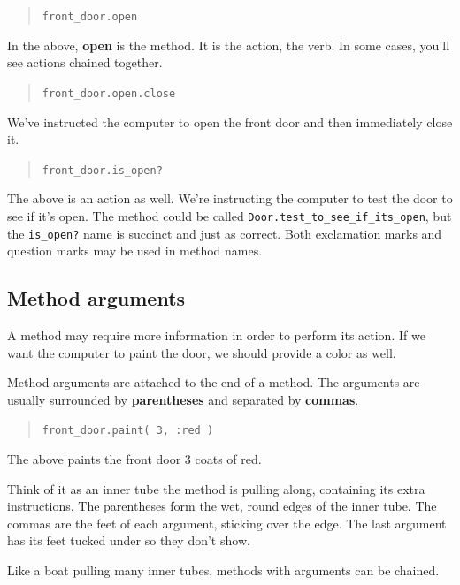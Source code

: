 \documentclass[10pt,twoside]{report}
\begin{document}
\begin{quote}
\lstinline[breaklines=true]|front_door.open|\end{quote}


In the above, {\bf open} is the method.  It is the action, the
verb. In some cases, you'll see actions chained together.

\begin{quote}
\lstinline[breaklines=true]|front_door.open.close|\end{quote}


We've instructed the computer to open the front door and then
immediately close it.

\begin{quote}
\lstinline[breaklines=true]|front_door.is_open?|\end{quote}


The above is an action as well.  We're instructing the computer to
test the door to see if it's open. The method could be called
\lstinline[breaklines=true]|Door.test_to_see_if_its_open|, but the
\lstinline[breaklines=true]|is_open?| name is succinct and just as
correct.  Both exclamation marks and question marks may be used in
method names.



\subsection{Method arguments}



A method may require more information in order to perform its action.
If we want the computer to paint the door, we should provide a color
as well.

Method arguments are attached to the end of a method.  The arguments
are usually surrounded by {\bf parentheses} and separated by {\bf
  commas}.

\begin{quote}
\lstinline[breaklines=true]|front_door.paint( 3, :red )|\end{quote}


The above paints the front door 3 coats of red.

Think of it as an inner tube the method is pulling along, containing
its extra instructions. The parentheses form the wet, round edges of
the inner tube.  The commas are the feet of each argument, sticking
over the edge.  The last argument has its feet tucked under so they
don't show.

Like a boat pulling many inner tubes, methods with arguments can be
chained.
\end{document}
